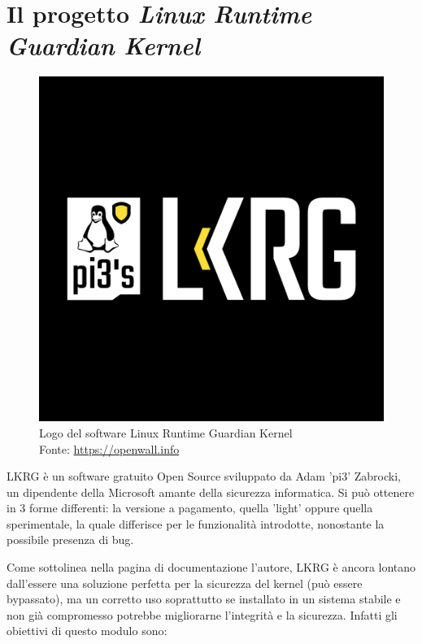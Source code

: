 \chapter{Il progetto \emph{Linux Runtime Guardian Kernel}}

\label{Chapter2}

\begin{figure}[!ht]
\centering
\includegraphics[scale=0.15]{Figures/Lkrg}
\caption[Logo del software Linux Runtime Guardian Kernel]{Logo del software Linux Runtime Guardian Kernel\\Fonte: \href{https://openwall.info/wiki/p_lkrg/Main}{\url{https://openwall.info}}}
\label{fig:Lkrg}
\end{figure}


LKRG è un software gratuito Open Source sviluppato da Adam 'pi3' Zabrocki, un dipendente della Microsoft amante della sicurezza informatica. Si può ottenere in 3 forme differenti: la versione a pagamento, quella 'light' oppure quella sperimentale, la quale differisce per le funzionalità introdotte, nonostante la possibile presenza di bug.

Come sottolinea nella pagina di documentazione l'autore, LKRG è ancora lontano dall'essere una soluzione perfetta per la sicurezza del kernel (può essere bypassato), ma un corretto uso soprattutto se installato in un sistema stabile e non già compromesso potrebbe migliorarne l'integrità e la sicurezza. Infatti gli obiettivi di questo modulo sono:

